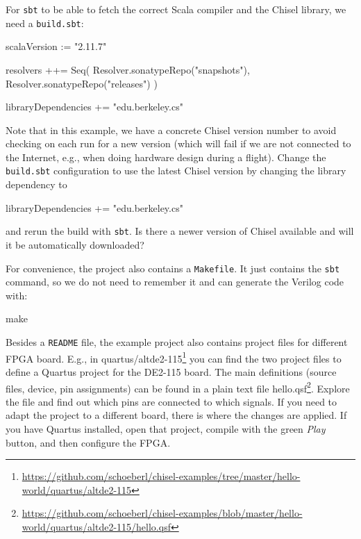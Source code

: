 \documentclass[%
    10pt,
    headinclude, footexclude,
    openright, %
    notitlepage,
    cleardoubleempty,
    headsepline,
    pointlessnumbers,
    bibtotoc, idxtotoc,
    ]{scrbook}
\newcommand{\code}[1]{{\small{\texttt{#1}}}}
\newcommand{\myref}[2]{\href{#1}{#2}}
\renewcommand{\myref}[2]{{#2}{\footnote{\url{#1}}}}
\begin{document}
For \code{sbt} to be able to fetch the correct Scala compiler and the Chisel library,
we need a \code{build.sbt}:

\begin{chisel}
scalaVersion := "2.11.7"

resolvers ++= Seq(
  Resolver.sonatypeRepo("snapshots"),
  Resolver.sonatypeRepo("releases")
)

libraryDependencies += "edu.berkeley.cs" %
\end{chisel}

\noindent Note that in this example, we have a concrete Chisel version number to avoid checking on
each run for a new version (which will fail if we are not connected to the Internet,
e.g., when doing hardware design during a flight).
Change the \code{build.sbt} configuration to use the latest Chisel version by changing the
library dependency to

\begin{chisel}
libraryDependencies += "edu.berkeley.cs" %
\end{chisel}

\noindent and rerun the build with \code{sbt}. Is there a newer version of Chisel
available and will it be automatically downloaded?

For convenience, the project also contains a \code{Makefile}.
It just contains the \code{sbt} command, so we do not need to remember it and
can generate the Verilog code with:

\begin{chisel}
make
\end{chisel}

Besides a \code{README} file, the example project also contains project
files for different FPGA board. E.g., in
\myref{https://github.com/schoeberl/chisel-examples/tree/master/hello-world/quartus/altde2-115}{quartus/altde2-115} 
you can find the two project files to define a Quartus project for the DE2-115 board.
The main definitions (source files, device, pin assignments) can be found in a plain text file
\myref{https://github.com/schoeberl/chisel-examples/blob/master/hello-world/quartus/altde2-115/hello.qsf}{hello.qsf}.
Explore the file and find out which pins are connected to which signals.
If you need to adapt the project to a different board, there is where the changes are applied.
If you have Quartus installed, open that project, compile with the green \emph{Play} button,
and then configure the FPGA.
\end{document}
